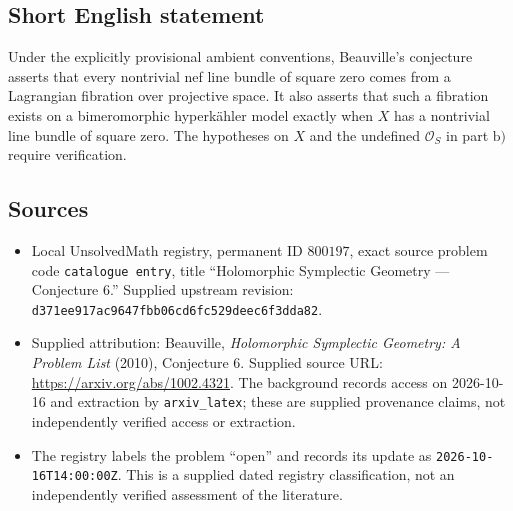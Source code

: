 \documentclass[11pt]{article}
\begin{document}
\subsection{Short English statement}
Under the explicitly provisional ambient conventions, Beauville's conjecture asserts that every nontrivial nef line bundle of square zero comes from a Lagrangian fibration over projective space. It also asserts that such a fibration exists on a bimeromorphic hyperk\"ahler model exactly when \(X\) has a nontrivial line bundle of square zero. The hypotheses on \(X\) and the undefined \(\mathcal O_S\) in part \(\mathrm{b)}\) require verification.
\subsection{Sources}
\begin{itemize}
\item Local UnsolvedMath registry, permanent ID \(800197\), exact source problem code \texttt{catalogue entry}, title ``Holomorphic Symplectic Geometry --- Conjecture 6.'' Supplied upstream revision: \texttt{d371ee917ac9647fbb06cd6fc529deec6f3dda82}.
\item Supplied attribution: Beauville, \emph{Holomorphic Symplectic Geometry: A Problem List} (2010), Conjecture 6. Supplied source URL: \url{https://arxiv.org/abs/1002.4321}. The background records access on 2026-10-16 and extraction by \texttt{arxiv\_latex}; these are supplied provenance claims, not independently verified access or extraction.
\item The registry labels the problem ``open'' and records its update as \texttt{2026-10-16T14:00:00Z}. This is a supplied dated registry classification, not an independently verified assessment of the literature.
\end{itemize}
\end{document}
